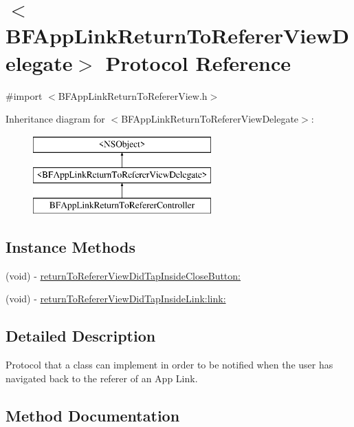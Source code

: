 \hypertarget{protocol_b_f_app_link_return_to_referer_view_delegate-p}{}\section{$<$B\+F\+App\+Link\+Return\+To\+Referer\+View\+Delegate$>$ Protocol Reference}
\label{protocol_b_f_app_link_return_to_referer_view_delegate-p}


{\ttfamily \#import $<$B\+F\+App\+Link\+Return\+To\+Referer\+View.\+h$>$}

Inheritance diagram for $<$B\+F\+App\+Link\+Return\+To\+Referer\+View\+Delegate$>$\+:\begin{figure}[H]
\begin{center}
\leavevmode
\includegraphics[height=3.000000cm]{protocol_b_f_app_link_return_to_referer_view_delegate-p}
\end{center}
\end{figure}
\subsection*{Instance Methods}
\begin{DoxyCompactItemize}
\item 
(void) -\/ \hyperlink{protocol_b_f_app_link_return_to_referer_view_delegate-p_ac587dae3654f9804b1ff307e785f439f}{return\+To\+Referer\+View\+Did\+Tap\+Inside\+Close\+Button\+:}
\item 
(void) -\/ \hyperlink{protocol_b_f_app_link_return_to_referer_view_delegate-p_a6e70cea27cddbc4bf47e64ca52213000}{return\+To\+Referer\+View\+Did\+Tap\+Inside\+Link\+:link\+:}
\end{DoxyCompactItemize}


\subsection{Detailed Description}
Protocol that a class can implement in order to be notified when the user has navigated back to the referer of an App Link. 

\subsection{Method Documentation}
\hypertarget{protocol_b_f_app_link_return_to_referer_view_delegate-p_ac587dae3654f9804b1ff307e785f439f}{}
